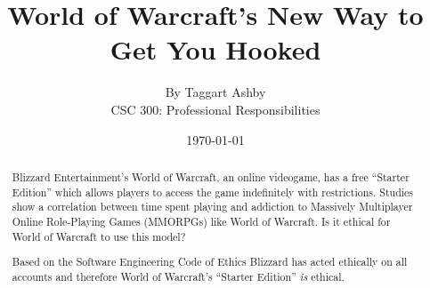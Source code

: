 \documentclass[11pt]{article}
\begin{document}

\title{\vfill World of Warcraft's New Way to Get You Hooked} %
\author{
By Taggart Ashby \vspace{10pt} \\
CSC 300: Professional Responsibilities  \vspace{10pt} \\
}
\date{\today} %

\maketitle


\vfill  %
\begin{abstract}
Blizzard Entertainment's World of Warcraft, an online videogame, has a free ``Starter Edition'' which allows players to access the game indefinitely with restrictions. \cite{starterEditionNewsRelease} Studies show a correlation between time spent playing and addiction to Massively Multiplayer Online Role-Playing Games (MMORPGs) like World of Warcraft. \cite{ProblemUsageAmongHighlyEngagedPlayers}\cite{JustAComputerGameRight} Is it ethical for World of Warcraft to use this model?

Based on the Software Engineering Code of Ethics \cite{SECode} Blizzard has acted ethically on all accounts and therefore World of Warcraft's ``Starter Edition'' \emph{is} ethical.
\end{abstract}

\thispagestyle{empty} %
\newpage


\thispagestyle{empty}  %
\tableofcontents

\newpage

\end{document}
